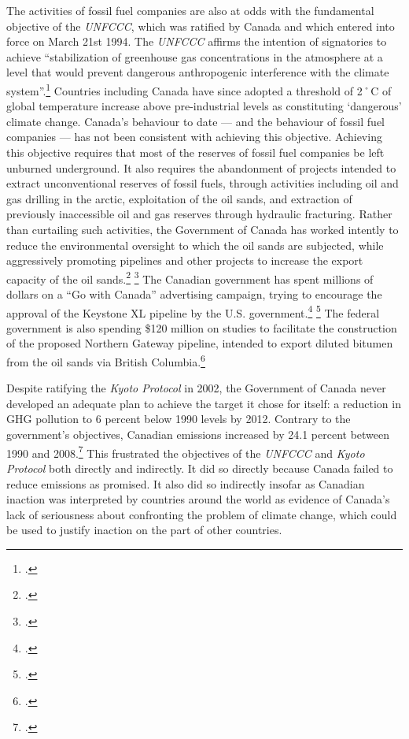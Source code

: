 \documentclass[10pt]{article}
\begin{document}
The activities of fossil fuel companies are also at odds with the fundamental objective of the \emph{UNFCCC}, which was ratified by Canada and which entered into force on March 21st 1994.
The \emph{UNFCCC} affirms the intention of signatories to achieve ``stabilization of greenhouse gas concentrations in the atmosphere at a level that would prevent dangerous anthropogenic interference with the climate system''.\footcite[][p. 4]{UNFCCC}
Countries including Canada have since adopted a threshold of 2˚C of global temperature increase above pre-industrial levels as constituting `dangerous' climate change.
Canada's behaviour to date --- and the behaviour of fossil fuel companies --- has not been consistent with achieving this objective.
Achieving this objective requires that most of the reserves of fossil fuel companies be left unburned underground.
It also requires the abandonment of projects intended to extract unconventional reserves of fossil fuels, through activities including oil and gas drilling in the arctic, exploitation of the oil sands, and extraction of previously inaccessible oil and gas reserves through hydraulic fracturing.
Rather than curtailing such activities, the Government of Canada has worked intently to reduce the environmental oversight to which the oil sands are subjected, while aggressively promoting pipelines and other projects to increase the export capacity of the oil sands.\footcite[See: ][]{PeterKentTrail} \footcite[][]{HarperSelling2013}
The Canadian government has spent millions of dollars on a ``Go with Canada'' advertising campaign, trying to encourage the approval of the Keystone XL pipeline by the U.S. government.\footcite[][]{HallKeystone2013} \footcite[See also: ][]{AdDetails2013}
The federal government is also spending \$120 million on studies to facilitate the construction of the proposed Northern Gateway pipeline, intended to export diluted bitumen from the oil sands via British Columbia.\footcite[][]{SubsidizingNGP}



Despite ratifying the \emph{Kyoto Protocol} in 2002, the Government of Canada never developed an adequate plan to achieve the target it chose for itself: a reduction in GHG pollution to 6 percent below 1990 levels by 2012.
Contrary to the government's objectives, Canadian emissions increased by 24.1 percent between 1990 and 2008.\footcite[][p. 3]{UNFCCCCanada2010}
This frustrated the objectives of the \emph{UNFCCC} and \emph{Kyoto Protocol} both directly and indirectly.
It did so directly because Canada failed to reduce emissions as promised.
It also did so indirectly insofar as Canadian inaction was interpreted by countries around the world as evidence of Canada's lack of seriousness about confronting the problem of climate change, which could be used to justify inaction on the part of other countries. 
\end{document}
